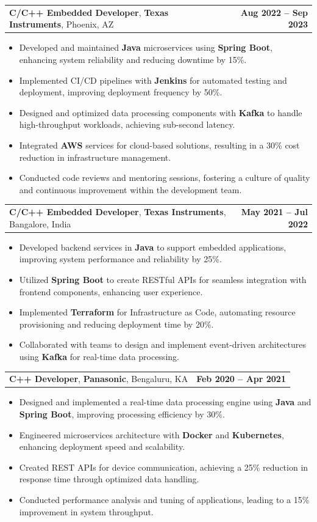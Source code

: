 \documentclass[letterpaper,11pt]{article}
\makeatletter
\newcommand{\resumeItem}[1]{
  \item\footnotesize{
    {#1 \vspace{-2pt}}
  }
}
\newcommand{\resumeSubheading}[4]{
  \vspace{-2pt}\item
    \begin{tabular*}{1.0\textwidth}[t]{l@{\extracolsep{\fill}}r}
      \textbf{\fontsize{10pt}{14pt}\selectfont #3}, \textbf{\fontsize{10pt}{14pt}\selectfont #1}, \fontsize{10pt}{14pt}\selectfont #4 & \textbf{\fontsize{10pt}{14pt}\selectfont #2} \\
    \end{tabular*}\vspace{-7pt}
}
\newcommand{\resumeItemListStart}{\begin{itemize}[leftmargin=*]}
\newcommand{\resumeItemListEnd}{\end{itemize}\vspace{-5pt}}
\makeatother
\begin{document}
    \resumeSubheading
        {Texas Instruments}{Aug 2022 -- Sep 2023}
        {C/C++ Embedded Developer}{Phoenix, AZ}
      \resumeItemListStart
        \resumeItem{Developed and maintained \textbf{Java} microservices using \textbf{Spring Boot}, enhancing system reliability and reducing downtime by 15\%.}
        \resumeItem{Implemented CI/CD pipelines with \textbf{Jenkins} for automated testing and deployment, improving deployment frequency by 50\%.}
        \resumeItem{Designed and optimized data processing components with \textbf{Kafka} to handle high-throughput workloads, achieving sub-second latency.}
        \resumeItem{Integrated \textbf{AWS} services for cloud-based solutions, resulting in a 30\% cost reduction in infrastructure management.}
        \resumeItem{Conducted code reviews and mentoring sessions, fostering a culture of quality and continuous improvement within the development team.}
      \resumeItemListEnd

    \resumeSubheading
        {Texas Instruments}{May 2021 -- Jul 2022}
        {C/C++ Embedded Developer}{Bangalore, India}
      \resumeItemListStart
        \resumeItem{Developed backend services in \textbf{Java} to support embedded applications, improving system performance and reliability by 25\%.}
        \resumeItem{Utilized \textbf{Spring Boot} to create RESTful APIs for seamless integration with frontend components, enhancing user experience.}
        \resumeItem{Implemented \textbf{Terraform} for Infrastructure as Code, automating resource provisioning and reducing deployment time by 20\%.}
        \resumeItem{Collaborated with teams to design and implement event-driven architectures using \textbf{Kafka} for real-time data processing.}
      \resumeItemListEnd

    \resumeSubheading
        {Panasonic}{Feb 2020 -- Apr 2021}
        {C++ Developer}{Bengaluru, KA}
      \resumeItemListStart
        \resumeItem{Designed and implemented a real-time data processing engine using \textbf{Java} and \textbf{Spring Boot}, improving processing efficiency by 30\%.}
        \resumeItem{Engineered microservices architecture with \textbf{Docker} and \textbf{Kubernetes}, enhancing deployment speed and scalability.}
        \resumeItem{Created REST APIs for device communication, achieving a 25\% reduction in response time through optimized data handling.}
        \resumeItem{Conducted performance analysis and tuning of applications, leading to a 15\% improvement in system throughput.}
      \resumeItemListEnd
\end{document}
